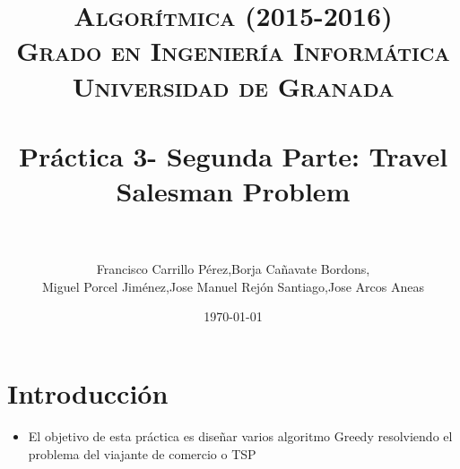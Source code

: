 
 \usepackage{algpseudocode}

\title{	
\normalfont \normalsize 
\textsc{{\bf Algorítmica (2015-2016)} \\ Grado en Ingeniería Informática \\ Universidad de Granada} \\ [25pt] %
\horrule{0.5pt} \\[0.4cm] %
\huge Práctica 3- Segunda Parte: Travel Salesman Problem \\ %
\horrule{2pt} \\[0.5cm] %
}

\author{Francisco Carrillo Pérez,Borja Cañavate Bordons, \\Miguel Porcel Jiménez,Jose Manuel Rejón Santiago,Jose Arcos Aneas} %

\date{\normalsize\today} %




\maketitle %

\newpage %

\tableofcontents %

\listoffigures

\listoftables

\newpage


	\section{Introducción }
	
		\begin{itemize}
			\item El objetivo de esta práctica es diseñar varios algoritmo Greedy resolviendo el problema del viajante de comercio o TSP
		\end{itemize}
	
